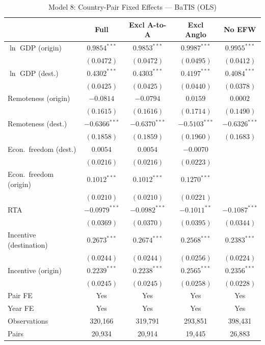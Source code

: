 \begin{table}[htbp]
\centering
\caption{Model 8: Country-Pair Fixed Effects --- BaTIS (OLS)}
\label{tab:batis_model8}
\footnotesize
\begin{tabular}{l cccc}
\toprule
  & Full & Excl A-to-A & Excl Anglo & No EFW \\
\midrule
$\ln$ GDP (origin) & $0.9854^{***}$ & $0.9853^{***}$ & $0.9987^{***}$ & $0.9955^{***}$ \\
 & $(0.0472)$ & $(0.0472)$ & $(0.0495)$ & $(0.0412)$ \\[4pt]
$\ln$ GDP (dest.) & $0.4302^{***}$ & $0.4303^{***}$ & $0.4197^{***}$ & $0.4084^{***}$ \\
 & $(0.0425)$ & $(0.0425)$ & $(0.0440)$ & $(0.0378)$ \\[4pt]
Remoteness (origin) & $-0.0814$ & $-0.0794$ & $0.0159$ & $0.0002$ \\
 & $(0.1615)$ & $(0.1616)$ & $(0.1714)$ & $(0.1490)$ \\[4pt]
Remoteness (dest.) & $-0.6366^{***}$ & $-0.6370^{***}$ & $-0.5103^{***}$ & $-0.6326^{***}$ \\
 & $(0.1858)$ & $(0.1859)$ & $(0.1960)$ & $(0.1683)$ \\[4pt]
Econ.\ freedom (dest.) & $0.0054$ & $0.0054$ & $-0.0070$ &  \\
 & $(0.0216)$ & $(0.0216)$ & $(0.0223)$ &  \\[4pt]
Econ.\ freedom (origin) & $0.1012^{***}$ & $0.1012^{***}$ & $0.1270^{***}$ &  \\
 & $(0.0210)$ & $(0.0210)$ & $(0.0221)$ &  \\[4pt]
RTA & $-0.0979^{***}$ & $-0.0982^{***}$ & $-0.1011^{**}$ & $-0.1087^{***}$ \\
 & $(0.0369)$ & $(0.0370)$ & $(0.0395)$ & $(0.0344)$ \\[4pt]
Incentive (destination) & $0.2673^{***}$ & $0.2674^{***}$ & $0.2568^{***}$ & $0.2383^{***}$ \\
 & $(0.0244)$ & $(0.0244)$ & $(0.0256)$ & $(0.0224)$ \\[4pt]
Incentive (origin) & $0.2239^{***}$ & $0.2238^{***}$ & $0.2565^{***}$ & $0.2356^{***}$ \\
 & $(0.0245)$ & $(0.0245)$ & $(0.0258)$ & $(0.0228)$ \\[4pt]
\midrule
Pair FE & Yes & Yes & Yes & Yes \\
Year FE & Yes & Yes & Yes & Yes \\
Observations & 320,166 & 319,791 & 293,851 & 398,431 \\
Pairs & 20,934 & 20,914 & 19,445 & 26,883 \\

\end{tabular}
\end{table}
